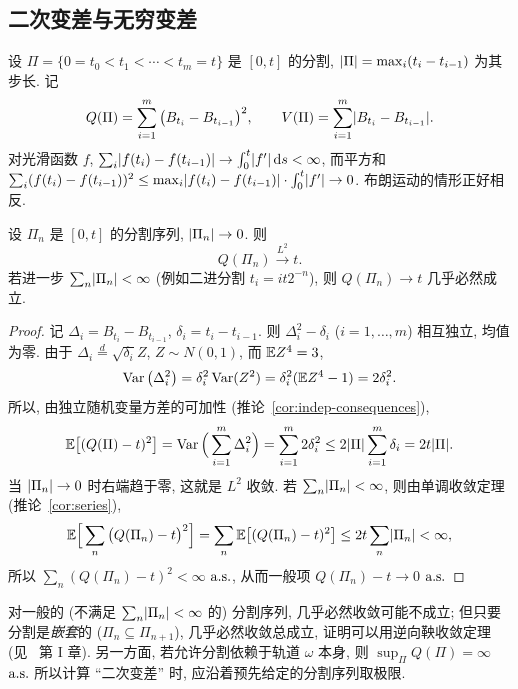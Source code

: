 \subsection{二次变差与无穷变差}

设 $\Pi=\{0=t_0<t_1<\cdots<t_m=t\}$ 是 $[0,t]$ 的分割, $\lvert\Pi\rvert=\max_i(t_i-t_{i-1})$ 为其步长. 记
\[
Q(\Pi)=\sum_{i=1}^m\big(B_{t_i}-B_{t_{i-1}}\big)^2,\qquad V(\Pi)=\sum_{i=1}^m\lvert B_{t_i}-B_{t_{i-1}}\rvert.
\]
对光滑函数 $f$, $\sum_i\lvert f(t_i)-f(t_{i-1})\rvert\to\int_0^t\lvert f'\rvert\mathop{}\!\mathrm{d} s<\infty$, 而平方和 $\sum_i(f(t_i)-f(t_{i-1}))^2\le\max_i\lvert f(t_i)-f(t_{i-1})\rvert\cdot\int_0^t\lvert f'\rvert\to0$. 布朗运动的情形正好相反.

\begin{theorem}[布朗运动的二次变差]\label{thm:bm-qv}
设 $\Pi_n$ 是 $[0,t]$ 的分割序列, $\lvert\Pi_n\rvert\to0$. 则
\[
Q(\Pi_n)\xrightarrow{L^2}t.
\]
若进一步 $\sum_n\lvert\Pi_n\rvert<\infty$ (例如二进分割 $t_i=it2^{-n}$), 则 $Q(\Pi_n)\to t$ 几乎必然成立.
\end{theorem}

\begin{proof}
记 $\Delta_i=B_{t_i}-B_{t_{i-1}}$, $\delta_i=t_i-t_{i-1}$. 则 $\Delta_i^2-\delta_i$ ($i=1,\dots,m$) 相互独立, 均值为零. 由于 $\Delta_i\overset{d}{=}\sqrt{\delta_i}Z$, $Z\sim N(0,1)$, 而 $\mathbb{E} Z^4=3$,
\[
\operatorname{Var}\big(\Delta_i^2\big)=\delta_i^2\operatorname{Var}(Z^2)=\delta_i^2(\mathbb{E} Z^4-1)=2\delta_i^2.
\]
所以, 由独立随机变量方差的可加性 (推论~\ref{cor:indep-consequences}),
\begin{equation}\label{eq:qv-variance}
\mathbb{E}\big[(Q(\Pi)-t)^2\big]=\operatorname{Var}\Big(\sum_{i=1}^m\Delta_i^2\Big)=\sum_{i=1}^m2\delta_i^2\le2\lvert\Pi\rvert\sum_{i=1}^m\delta_i=2t\lvert\Pi\rvert.
\end{equation}
当 $\lvert\Pi_n\rvert\to0$ 时右端趋于零, 这就是 $L^2$ 收敛. 若 $\sum_n\lvert\Pi_n\rvert<\infty$, 则由单调收敛定理 (推论~\ref{cor:series}),
\[
\mathbb{E}\Big[\sum_n\big(Q(\Pi_n)-t\big)^2\Big]=\sum_n\mathbb{E}\big[(Q(\Pi_n)-t)^2\big]\le2t\sum_n\lvert\Pi_n\rvert<\infty,
\]
所以 $\sum_n(Q(\Pi_n)-t)^2<\infty$ $\text{a.s.}$, 从而一般项 $Q(\Pi_n)-t\to0$ $\text{a.s.}$
\end{proof}

\begin{remark}
对一般的 (不满足 $\sum_n\lvert\Pi_n\rvert<\infty$ 的) 分割序列, 几乎必然收敛可能不成立; 但只要分割是\emph{嵌套}的 ($\Pi_n\subseteq\Pi_{n+1}$), 几乎必然收敛总成立, 证明可以用逆向鞅收敛定理 (见~\cite{revuz} 第 I 章). 另一方面, 若允许分割依赖于轨道 $\omega$ 本身, 则 $\sup_\Pi Q(\Pi)=\infty$ $\text{a.s.}$ 所以计算 ``二次变差'' 时, 应沿着预先给定的分割序列取极限.
\end{remark}

